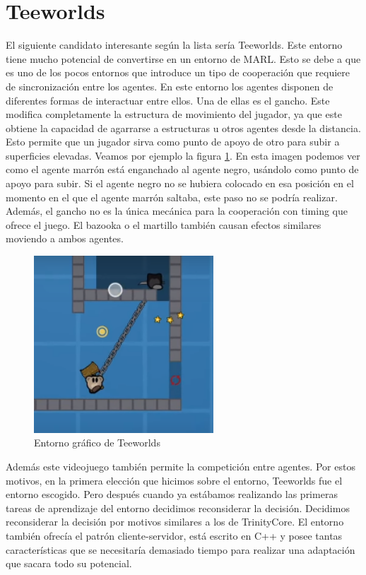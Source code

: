 \section{Teeworlds}

El siguiente candidato interesante según la lista sería Teeworlds. Este entorno tiene mucho potencial de convertirse en un entorno de MARL. Esto se debe a que es uno de los pocos entornos que introduce un tipo de cooperación que requiere de sincronización entre los agentes. En este entorno los agentes disponen de diferentes formas de interactuar entre ellos. Una de ellas es el gancho. Este modifica completamente la estructura de movimiento del jugador, ya que este obtiene la capacidad de agarrarse a estructuras u otros agentes desde la distancia. Esto permite que un jugador sirva como punto de apoyo de otro para subir a superficies elevadas. Veamos por ejemplo la figura \ref {fig:teeworlds-ex}. En esta imagen podemos ver como el agente marrón está enganchado al agente negro, usándolo como punto de apoyo para subir. Si el agente negro no se hubiera colocado en esa posición en el momento en el que el agente marrón saltaba, este paso no se podría realizar. Además, el gancho no es la única mecánica para la cooperación con timing que ofrece el juego. El bazooka o el martillo también causan efectos similares moviendo a ambos agentes.

\begin{figure}[ht]
    \centering
    \includegraphics[width=0.6\textwidth]{img/teewords-ex.png}
    \caption{Entorno gráfico de Teeworlds \cite {teeworlds}}
    \label{fig:teeworlds-ex}
\end{figure}

Además este videojuego también permite la competición entre agentes. Por estos motivos, en la primera elección que hicimos sobre el entorno, Teeworlds fue el entorno escogido. Pero después cuando ya estábamos realizando las primeras tareas de aprendizaje del entorno decidimos reconsiderar la decisión. Decidimos reconsiderar la decisión por motivos similares a los de TrinityCore. El entorno también ofrecía el patrón cliente-servidor, está escrito en C++ y posee tantas características que se necesitaría demasiado tiempo para realizar una adaptación que sacara todo su potencial. 

